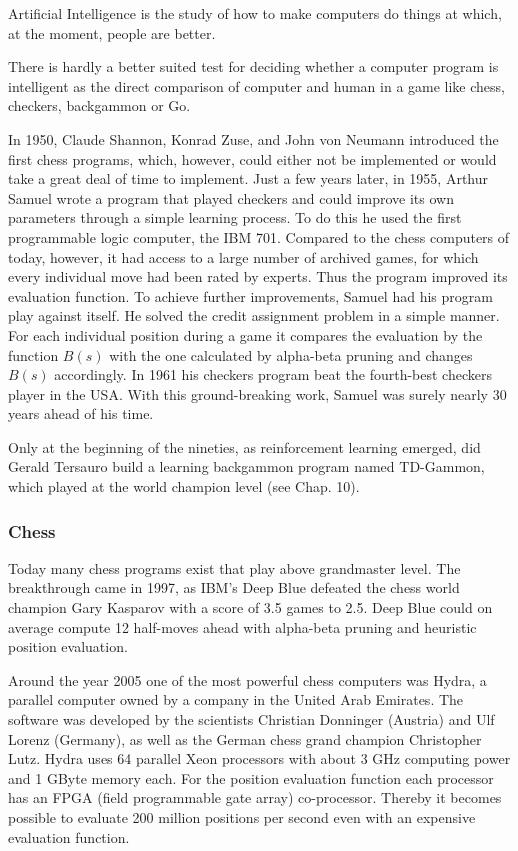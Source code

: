 \documentclass[10pt]{article}
\begin{document}
Artificial Intelligence is the study of how to make computers do things at which, at the moment, people are better.

There is hardly a better suited test for deciding whether a computer program is intelligent as the direct comparison of computer and human in a game like chess, checkers, backgammon or Go.

In 1950, Claude Shannon, Konrad Zuse, and John von Neumann introduced the first chess programs, which, however, could either not be implemented or would take a great deal of time to implement. Just a few years later, in 1955, Arthur Samuel wrote a program that played checkers and could improve its own parameters through a simple learning process. To do this he used the first programmable logic computer, the IBM 701. Compared to the chess computers of today, however, it had access to a large number of archived games, for which every individual move had been rated by experts. Thus the program improved its evaluation function. To achieve further improvements, Samuel had his program play against itself. He solved the credit assignment problem in a simple manner. For each individual position during a game it compares the evaluation by the function $B(s)$ with the one calculated by alpha-beta pruning and changes $B(s)$ accordingly. In 1961 his checkers program beat the fourth-best checkers player in the USA. With this ground-breaking work, Samuel was surely nearly 30 years ahead of his time.

Only at the beginning of the nineties, as reinforcement learning emerged, did Gerald Tersauro build a learning backgammon program named TD-Gammon, which played at the world champion level (see Chap. 10).

\subsubsection*{Chess}
Today many chess programs exist that play above grandmaster level. The breakthrough came in 1997, as IBM's Deep Blue defeated the chess world champion Gary Kasparov with a score of 3.5 games to 2.5. Deep Blue could on average compute 12 half-moves ahead with alpha-beta pruning and heuristic position evaluation.

Around the year 2005 one of the most powerful chess computers was Hydra, a parallel computer owned by a company in the United Arab Emirates. The software was developed by the scientists Christian Donninger (Austria) and Ulf Lorenz (Germany), as well as the German chess grand champion Christopher Lutz. Hydra uses 64 parallel Xeon processors with about 3 GHz computing power and 1 GByte memory each. For the position evaluation function each processor has an FPGA (field programmable gate array) co-processor. Thereby it becomes possible to evaluate 200 million positions per second even with an expensive evaluation function.
\end{document}
